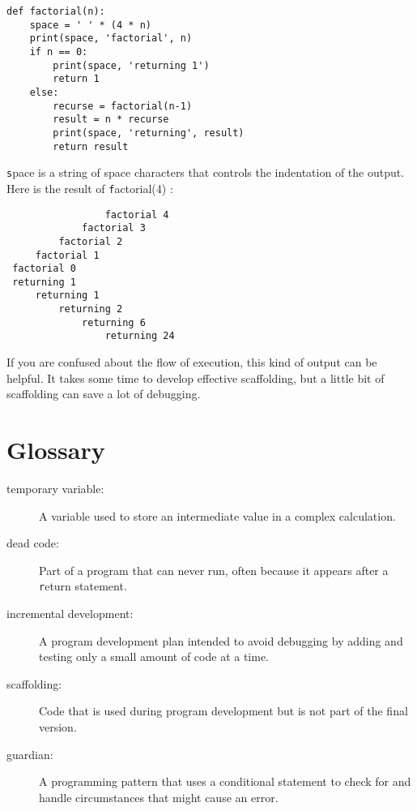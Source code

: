 \documentclass[
DIV=11,
fontsize=13,
twoside,
headinclude=false,
titlepage=firstiscover,
abstract=true,
headsepline=true,
footsepline=true,
chapterprefix=true, %
headings=big,
bibliography=totoc,%
captions=tableheading
]{scrbook}
\theoremstyle{definition}
\begin{document}
\begin{lstlisting}
def factorial(n):
    space = ' ' * (4 * n)
    print(space, 'factorial', n)
    if n == 0:
        print(space, 'returning 1')
        return 1
    else:
        recurse = factorial(n-1)
        result = n * recurse
        print(space, 'returning', result)
        return result
\end{lstlisting}
%
{\texttt space} is a string of space characters that controls the
indentation of the output.  Here is the result of {\texttt factorial(4)} :

\begin{lstlisting}
                 factorial 4
             factorial 3
         factorial 2
     factorial 1
 factorial 0
 returning 1
     returning 1
         returning 2
             returning 6
                 returning 24
\end{lstlisting}
%
If you are confused about the flow of execution, this kind of
output can be helpful.  It takes some time to develop effective
scaffolding, but a little bit of scaffolding can save a lot of debugging.


\section{Glossary}

\begin{description}

\item[temporary variable:]  A variable used to store an intermediate value in
a complex calculation.

\item[dead code:]  Part of a program that can never run, often because
it appears after a {\texttt return} statement.

\item[incremental development:]  A program development plan intended to
avoid debugging by adding and testing only
a small amount of code at a time.

\item[scaffolding:]  Code that is used during program development but is
not part of the final version.

\item[guardian:]  A programming pattern that uses a conditional
statement to check for and handle circumstances that
might cause an error.

\end{description}
\end{document}
